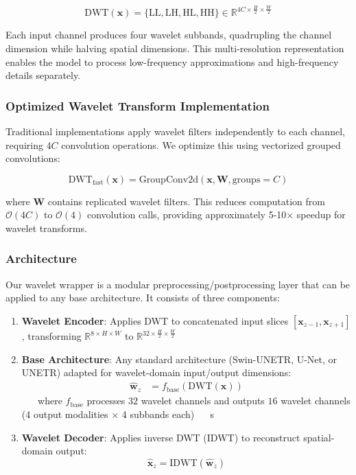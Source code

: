 \documentclass[conference]{IEEEtran}
\begin{document}
\begin{equation}
\text{DWT}(\mathbf{x}) = \{\text{LL}, \text{LH}, \text{HL}, \text{HH}\} \in \mathbb{R}^{4C \times \frac{H}{2} \times \frac{W}{2}}
\end{equation}

Each input channel produces four wavelet subbands, quadrupling the channel dimension while halving spatial dimensions. This multi-resolution representation enables the model to process low-frequency approximations and high-frequency details separately.

\subsubsection{Optimized Wavelet Transform Implementation}

Traditional implementations apply wavelet filters independently to each channel, requiring $4C$ convolution operations. We optimize this using vectorized grouped convolutions:

\begin{equation}
\text{DWT}_{\text{fast}}(\mathbf{x}) = \text{GroupConv2d}(\mathbf{x}, \mathbf{W}, \text{groups}=C)
\end{equation}

where $\mathbf{W}$ contains replicated wavelet filters. This reduces computation from $\mathcal{O}(4C)$ to $\mathcal{O}(4)$ convolution calls, providing approximately 5-10× speedup for wavelet transforms.

\subsubsection{Architecture}

Our wavelet wrapper is a modular preprocessing/postprocessing layer that can be applied to any base architecture. It consists of three components:

\begin{enumerate}
    \item \textbf{Wavelet Encoder}: Applies DWT to concatenated input slices $[\mathbf{x}_{z-1}, \mathbf{x}_{z+1}]$, transforming $\mathbb{R}^{8 \times H \times W}$ to $\mathbb{R}^{32 \times \frac{H}{2} \times \frac{W}{2}}$
    
    \item \textbf{Base Architecture}: Any standard architecture (Swin-UNETR, U-Net, or UNETR) adapted for wavelet-domain input/output dimensions:
    \begin{align}
    \hat{\mathbf{w}}_z &= f_{\text{base}}(\text{DWT}(\mathbf{x}))
    \end{align}
    where $f_{\text{base}}$ processes $32$ wavelet channels and outputs $16$ wavelet channels (4 output modalities × 4 subbands each)
   s 
    \item \textbf{Wavelet Decoder}: Applies inverse DWT (IDWT) to reconstruct spatial-domain output:
    \begin{equation}
    \hat{\mathbf{x}}_z = \text{IDWT}(\hat{\mathbf{w}}_z)
    \end{equation}
\end{enumerate}
\end{document}
